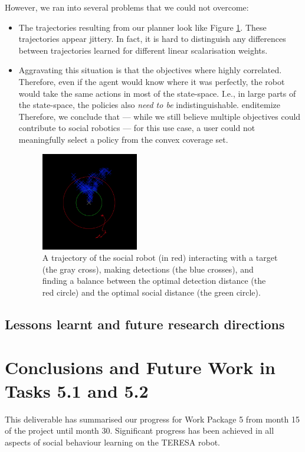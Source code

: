 \documentclass[a4paper,11pt]{report}
\begin{document}
However, we ran into several problems that we could not overcome: 
\begin{itemize}
\item The trajectories resulting from our planner look like Figure \ref{fig:motraj}. These trajectories appear jittery. In fact, it is hard to distinguish any differences between trajectories learned for different linear scalarisation weights. 
\item Aggravating this situation is that the objectives where highly correlated. Therefore, even if the agent would know where it was perfectly, the robot would take the same actions in most of the state-space. I.e., in large parts of the state-space, the policies also \emph{need to be} indistinguishable. 
end{itemize}
Therefore, we conclude that --- while we still believe multiple objectives could contribute to social robotics --- for this use case, a user could not meaningfully select a policy from the convex coverage set. 
\begin{figure}
\centering
\includegraphics[width=0.4\textwidth]{motrajectory.png}
\caption{A trajectory of the social robot (in red) interacting with a target (the gray 
cross), making detections (the blue crosses), and finding a balance between the optimal 
detection distance (the red circle) and the optimal social distance (the green circle).}
\label{fig:motraj}
\end{figure}
\end{itemize}
\subsection{Lessons learnt and future research directions}


\section{Conclusions and Future Work in Tasks 5.1 and 5.2}
\label{sec:conclusions}
This deliverable has summarised our progress for Work Package 5 from month 15 of the project until month 30. Significant progress has been achieved in all aspects of social behaviour learning on the TERESA robot. 
\end{document}
